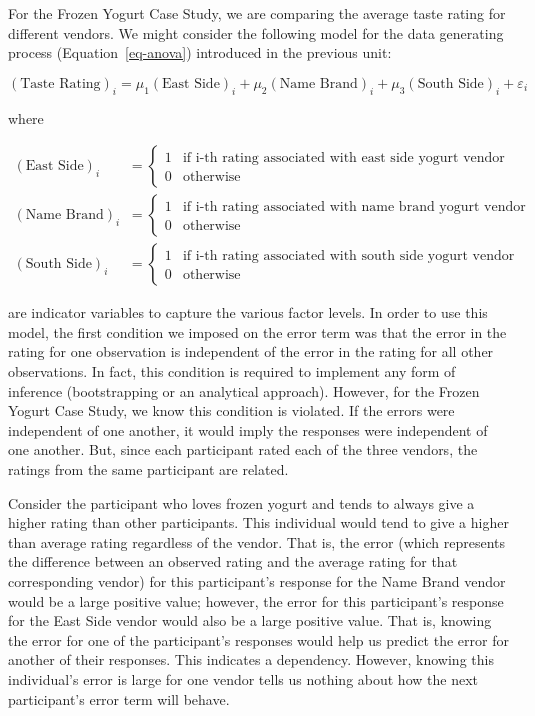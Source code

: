 \documentclass[
  letterpaper,
  DIV=11,
  numbers=noendperiod]{scrreprt}
\theoremstyle{plain}
\theoremstyle{definition}
\theoremstyle{definition}
\theoremstyle{remark}
\begin{document}
For the Frozen Yogurt Case Study, we are comparing the average taste
rating for different vendors. We might consider the following model for
the data generating process (Equation~\ref{eq-anova}) introduced in the
previous unit:

\[(\text{Taste Rating})_i = \mu_1 (\text{East Side})_i + \mu_2 (\text{Name Brand})_i + \mu_3 (\text{South Side})_i + \varepsilon_i\]

where

\[
\begin{aligned}
  (\text{East Side})_i &= \begin{cases}
    1 & \text{if i-th rating associated with east side yogurt vendor} \\
    0 & \text{otherwise}
    \end{cases} \\
  (\text{Name Brand})_i &= \begin{cases}
    1 & \text{if i-th rating associated with name brand yogurt vendor} \\
    0 & \text{otherwise}
    \end{cases} \\
  (\text{South Side})_i &= \begin{cases}
    1 & \text{if i-th rating associated with south side yogurt vendor} \\
    0 & \text{otherwise}
    \end{cases} 
\end{aligned}
\]

are indicator variables to capture the various factor levels. In order
to use this model, the first condition we imposed on the error term was
that the error in the rating for one observation is independent of the
error in the rating for all other observations. In fact, this condition
is required to implement any form of inference (bootstrapping or an
analytical approach). However, for the Frozen Yogurt Case Study, we know
this condition is violated. If the errors were independent of one
another, it would imply the responses were independent of one another.
But, since each participant rated each of the three vendors, the ratings
from the same participant are related.

Consider the participant who loves frozen yogurt and tends to always
give a higher rating than other participants. This individual would tend
to give a higher than average rating regardless of the vendor. That is,
the error (which represents the difference between an observed rating
and the average rating for that corresponding vendor) for this
participant's response for the Name Brand vendor would be a large
positive value; however, the error for this participant's response for
the East Side vendor would also be a large positive value. That is,
knowing the error for one of the participant's responses would help us
predict the error for another of their responses. This indicates a
dependency. However, knowing this individual's error is large for one
vendor tells us nothing about how the next participant's error term will
behave.
\end{document}
